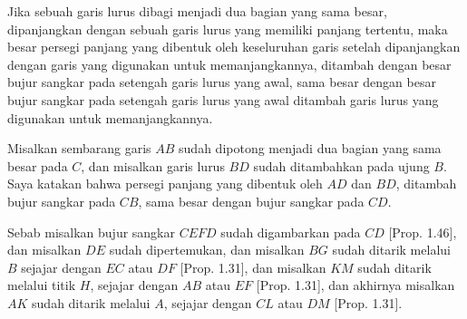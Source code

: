 \documentclass[a4paper]{book}
\begin{document}
Jika sebuah garis lurus dibagi menjadi dua bagian yang sama besar, 
dipanjangkan dengan sebuah garis lurus yang memiliki panjang tertentu, maka besar
persegi panjang yang dibentuk oleh keseluruhan garis setelah dipanjangkan 
 dengan garis yang digunakan untuk memanjangkannya, ditambah dengan besar bujur 
sangkar pada setengah garis lurus yang awal, sama besar dengan besar bujur sangkar 
pada setengah garis lurus yang awal ditambah garis lurus yang 
digunakan untuk memanjangkannya.

\begin{center}
\end{center}

Misalkan sembarang garis $AB$ sudah dipotong menjadi dua bagian yang sama
besar pada $C$, dan misalkan garis lurus $BD$ sudah ditambahkan pada ujung
$B$. Saya katakan bahwa persegi panjang yang dibentuk oleh $AD$ dan $BD$, 
ditambah bujur sangkar pada $CB$, sama besar dengan bujur sangkar pada $CD$.

Sebab misalkan bujur sangkar $CEFD$ sudah digambarkan pada $CD$ [Prop. 1.46],
dan misalkan $DE$ sudah dipertemukan, dan misalkan $BG$ sudah ditarik melalui
$B$ sejajar dengan $EC$ atau $DF$ [Prop. 1.31], dan misalkan $KM$ sudah ditarik
melalui titik $H$, sejajar dengan $AB$ atau $EF$ [Prop. 1.31], dan akhirnya
misalkan $AK$ sudah ditarik melalui $A$, sejajar dengan $CL$ atau 
$DM$ [Prop. 1.31].
\end{document}
